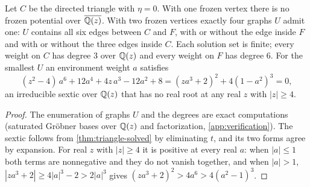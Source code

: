 \begin{proposition}\label{prop:env-barrier}
Let $C$ be the directed triangle with $\eta=0$. With one frozen vertex there is no frozen potential over $\overline{\mathbb{Q}(z)}$. With two frozen vertices exactly four graphs $U$ admit one: $U$ contains all six edges between $C$ and $F$, with or without the edge inside $F$ and with or without the three edges inside $C$. Each solution set is finite; every weight on $C$ has degree $3$ over $\mathbb{Q}(z)$ and every weight on $F$ has degree $6$. For the smallest $U$ an environment weight $a$ satisfies
\[
(z^{2}-4)\,a^{6}+12a^{4}+4z\,a^{3}-12a^{2}+8=(za^{3}+2)^{2}+4(1-a^{2})^{3}=0,
\]
an irreducible sextic over $\mathbb{Q}(z)$ that has no real root at any real $z$ with $|z|\ge4$.
\end{proposition}
\begin{proof}
The enumeration of graphs $U$ and the degrees are exact computations (saturated Gr\"obner bases over $\mathbb{Q}(z)$ and factorization, \cref{app:verification}). The sextic follows from \cref{thm:triangle-solved} by eliminating $t$, and its two forms agree by expansion. For real $z$ with $|z|\ge4$ it is positive at every real $a$: when $|a|\le1$ both terms are nonnegative and they do not vanish together, and when $|a|>1$, $|za^{3}+2|\ge4|a|^3-2>2|a|^{3}$ gives $(za^{3}+2)^{2}>4a^{6}>4(a^{2}-1)^{3}$.
\end{proof}

